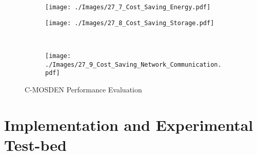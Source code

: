\documentclass[journal]{IEEEtran}
\begin{document}
\begin{figure*}[t!]
             \begin{subfigure}[b]{165pt}
                \centering
                \texttt{[image: ./Images/27\_7\_Cost\_Saving\_Energy.pdf]}
\caption{\footnotesize }
                \label{Figure:Cost_Saving_Energy}
                          \end{subfigure}  
                \begin{subfigure}[b]{165pt}
                        \centering
                        \texttt{[image: ./Images/27\_8\_Cost\_Saving\_Storage.pdf]}
                        \vspace{-16pt}
                        \caption{\footnotesize }
                        \label{Figure:Cost_Saving_Storage}
                \end{subfigure}
                ~ \begin{subfigure}[b]{165pt}
                        \centering
                        \texttt{[image: ./Images/27\_9\_Cost\_Saving\_Network\_Communication.pdf]}
                        \vspace{-16pt}
                        \caption{\footnotesize }
                        \label{Figure:Cost_Saving_Network_Communication}
                \end{subfigure}
                \label{fig:animals}
        \caption{C-MOSDEN Performance Evaluation}
        \vspace{-20pt}
\end{figure*}

\section{Implementation and Experimental Test-bed}
\label{sec:Implementation}
\end{document}
